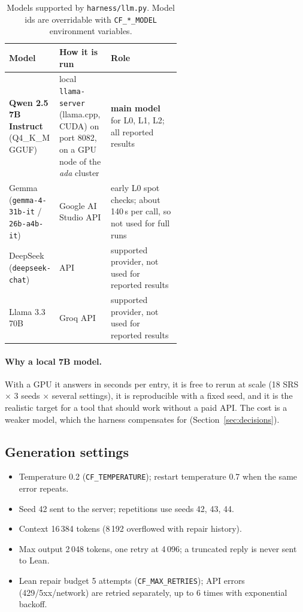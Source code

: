 \documentclass[11pt,a4paper]{article}
\newcommand{\code}[1]{\texttt{#1}}
\newcommand{\file}[1]{\texttt{#1}}
\begin{document}
\begin{table}[h]
\centering
\small
\begin{tabularx}{\linewidth}{>{\raggedright\arraybackslash}p{0.27\linewidth} >{\raggedright\arraybackslash}p{0.3\linewidth} L}
\toprule
Model & How it is run & Role \\
\midrule
\textbf{Qwen 2.5 7B Instruct} (Q4\_K\_M GGUF) & local \code{llama-server} (llama.cpp, CUDA) on port 8082, on a GPU node of the \emph{ada} cluster & \textbf{main model} for L0, L1, L2; all reported results \\
Gemma (\code{gemma-4-31b-it} / \code{26b-a4b-it}) & Google AI Studio API & early L0 spot checks; about 140\,s per call, so not used for full runs \\
DeepSeek (\code{deepseek-chat}) & API & supported provider, not used for reported results \\
Llama 3.3 70B & Groq API & supported provider, not used for reported results \\
\bottomrule
\end{tabularx}
\caption{Models supported by \file{harness/llm.py}. Model ids are overridable with
\code{CF\_*\_MODEL} environment variables.}
\end{table}

\paragraph{Why a local 7B model.} With a GPU it answers in seconds per entry, it is free to
rerun at scale (18 SRS $\times$ 3 seeds $\times$ several settings), it is reproducible with a
fixed seed, and it is the realistic target for a tool that should work without a paid API.
The cost is a weaker model, which the harness compensates for (Section~\ref{sec:decisions}).

\subsection{Generation settings}
\begin{itemize}
  \item Temperature 0.2 (\code{CF\_TEMPERATURE}); restart temperature 0.7 when the same error repeats.
  \item Seed 42 sent to the server; repetitions use seeds 42, 43, 44.
  \item Context 16\,384 tokens (8\,192 overflowed with repair history).
  \item Max output 2\,048 tokens, one retry at 4\,096; a truncated reply is never sent to Lean.
  \item Lean repair budget 5 attempts (\code{CF\_MAX\_RETRIES}); API errors (429/5xx/network) are
        retried separately, up to 6 times with exponential backoff.
\end{itemize}
\end{document}
